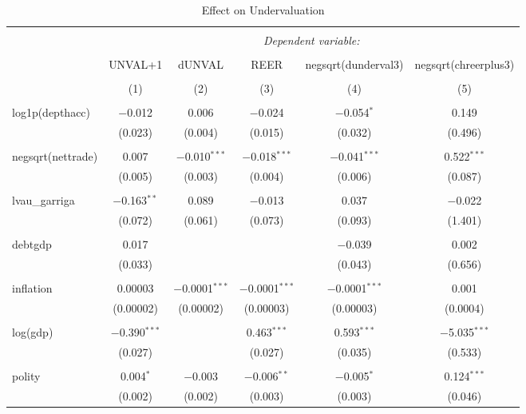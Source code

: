 \documentclass[]{article}
\begin{document}
\begin{table}[!htbp] \centering 
  \caption{Effect on Undervaluation} 
  \label{} 
\begin{tabular}{@{\extracolsep{5pt}}lccccc} 
\\[-1.8ex]\hline 
\hline \\[-1.8ex] 
 & \multicolumn{5}{c}{\textit{Dependent variable:}} \\ 
\cline{2-6} 
\\[-1.8ex] & UNVAL+1 & dUNVAL & REER & negsqrt(dunderval3) & negsqrt(chreerplus3) \\ 
\\[-1.8ex] & (1) & (2) & (3) & (4) & (5)\\ 
\hline \\[-1.8ex] 
 log1p(depthacc) & $-$0.012 & 0.006 & $-$0.024 & $-$0.054$^{*}$ & 0.149 \\ 
  & (0.023) & (0.004) & (0.015) & (0.032) & (0.496) \\ 
  & & & & & \\ 
 negsqrt(nettrade) & 0.007 & $-$0.010$^{***}$ & $-$0.018$^{***}$ & $-$0.041$^{***}$ & 0.522$^{***}$ \\ 
  & (0.005) & (0.003) & (0.004) & (0.006) & (0.087) \\ 
  & & & & & \\ 
 lvau\_garriga & $-$0.163$^{**}$ & 0.089 & $-$0.013 & 0.037 & $-$0.022 \\ 
  & (0.072) & (0.061) & (0.073) & (0.093) & (1.401) \\ 
  & & & & & \\ 
 debtgdp & 0.017 &  &  & $-$0.039 & 0.002 \\ 
  & (0.033) &  &  & (0.043) & (0.656) \\ 
  & & & & & \\ 
 inflation & 0.00003 & $-$0.0001$^{***}$ & $-$0.0001$^{***}$ & $-$0.0001$^{***}$ & 0.001 \\ 
  & (0.00002) & (0.00002) & (0.00003) & (0.00003) & (0.0004) \\ 
  & & & & & \\ 
 log(gdp) & $-$0.390$^{***}$ &  & 0.463$^{***}$ & 0.593$^{***}$ & $-$5.035$^{***}$ \\ 
  & (0.027) &  & (0.027) & (0.035) & (0.533) \\ 
  & & & & & \\ 
 polity & 0.004$^{*}$ & $-$0.003 & $-$0.006$^{**}$ & $-$0.005$^{*}$ & 0.124$^{***}$ \\ 
  & (0.002) & (0.002) & (0.003) & (0.003) & (0.046) \\ 

\end{tabular}
\end{table}
\end{document}
